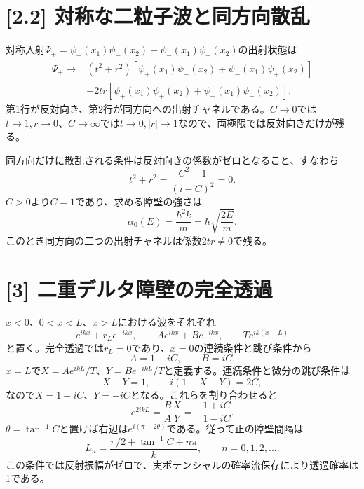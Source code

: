 \documentclass[11pt,a4paper]{article}
\begin{document}
\section*{[2.2] 対称な二粒子波と同方向散乱}
対称入射$\Psi_+=\psi_+(x_1)\psi_-(x_2)+\psi_-(x_1)\psi_+(x_2)$の出射状態は
\begin{align}
 \Psi_+\longmapsto{}&(t^2+r^2)\left[\psi_+(x_1)\psi_-(x_2)+\psi_-(x_1)\psi_+(x_2)\right]\\
 &+2tr\left[\psi_+(x_1)\psi_+(x_2)+\psi_-(x_1)\psi_-(x_2)\right].
\end{align}
第1行が反対向き、第2行が同方向への出射チャネルである。$C\to0$では$t\to1,r\to0$、$C\to\infty$では$t\to0,|r|\to1$なので、両極限では反対向きだけが残る。

同方向だけに散乱される条件は反対向きの係数がゼロとなること、すなわち
\begin{equation}
 t^2+r^2=\frac{C^2-1}{(i-C)^2}=0.
\end{equation}
$C>0$より$C=1$であり、求める障壁の強さは
\begin{equation}
 \boxed{\alpha_0(E)=\frac{\hbar^2k}{m}=\hbar\sqrt{\frac{2E}{m}}}.
\end{equation}
このとき同方向の二つの出射チャネルは係数$2tr\ne0$で残る。

\section*{[3] 二重デルタ障壁の完全透過}
$x<0$、$0<x<L$、$x>L$における波をそれぞれ
\begin{equation}
 e^{ikx}+r_Le^{-ikx},\qquad Ae^{ikx}+Be^{-ikx},\qquad Te^{ik(x-L)}
\end{equation}
と置く。完全透過では$r_L=0$であり、$x=0$の連続条件と跳び条件から
\begin{equation}
 A=1-iC,\qquad B=iC.
\end{equation}
$x=L$で$X=Ae^{ikL}/T$、$Y=Be^{-ikL}/T$と定義する。連続条件と微分の跳び条件は
\begin{equation}
 X+Y=1,\qquad i(1-X+Y)=2C,
\end{equation}
なので$X=1+iC$、$Y=-iC$となる。これらを割り合わせると
\begin{equation}
 e^{2ikL}=\frac BA\frac XY=-\frac{1+iC}{1-iC}.
\end{equation}
$\theta=\tan^{-1}C$と置けば右辺は$e^{i(\pi+2\theta)}$である。従って正の障壁間隔は
\begin{equation}
 \boxed{L_n=\frac{\pi/2+\tan^{-1}C+n\pi}{k}},\qquad n=0,1,2,\ldots.
\end{equation}
この条件では反射振幅がゼロで、実ポテンシャルの確率流保存により透過確率は1である。
\end{document}

